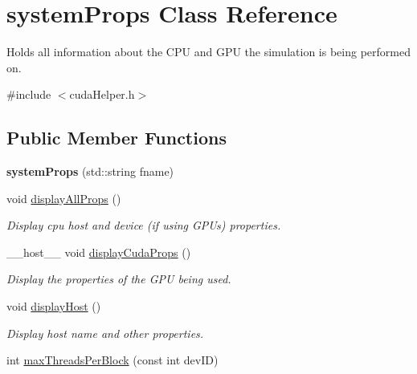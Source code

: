 \hypertarget{classsystem_props}{\section{system\-Props Class Reference}
\label{classsystem_props}
}


Holds all information about the C\-P\-U and G\-P\-U the simulation is being performed on.  




{\ttfamily \#include $<$cuda\-Helper.\-h$>$}

\subsection*{Public Member Functions}
\begin{DoxyCompactItemize}
\item 
\hypertarget{classsystem_props_a95e6d858d3ee3a0c9670156cf07c9e74}{{\bfseries system\-Props} (std\-::string fname)}\label{classsystem_props_a95e6d858d3ee3a0c9670156cf07c9e74}

\item 
\hypertarget{classsystem_props_a5268e0f1a250cdf0810e9d899b85bea2}{void \hyperlink{classsystem_props_a5268e0f1a250cdf0810e9d899b85bea2}{display\-All\-Props} ()}\label{classsystem_props_a5268e0f1a250cdf0810e9d899b85bea2}

\begin{DoxyCompactList}\small\item\em Display cpu host and device (if using G\-P\-Us) properties. \end{DoxyCompactList}\item 
\hypertarget{classsystem_props_aec22f83e71043fd60cb61a45fcc25b02}{\-\_\-\-\_\-host\-\_\-\-\_\- void \hyperlink{classsystem_props_aec22f83e71043fd60cb61a45fcc25b02}{display\-Cuda\-Props} ()}\label{classsystem_props_aec22f83e71043fd60cb61a45fcc25b02}

\begin{DoxyCompactList}\small\item\em Display the properties of the G\-P\-U being used. \end{DoxyCompactList}\item 
\hypertarget{classsystem_props_aeec628e3f468a2b274f08a0777dea6f1}{void \hyperlink{classsystem_props_aeec628e3f468a2b274f08a0777dea6f1}{display\-Host} ()}\label{classsystem_props_aeec628e3f468a2b274f08a0777dea6f1}

\begin{DoxyCompactList}\small\item\em Display host name and other properties. \end{DoxyCompactList}\item 
\hypertarget{classsystem_props_acfde8d62af2c239f6a52c02985099185}{int \hyperlink{classsystem_props_acfde8d62af2c239f6a52c02985099185}{max\-Threads\-Per\-Block} (const int dev\-I\-D)}\label{classsystem_props_acfde8d62af2c239f6a52c02985099185}


\end{DoxyCompactItemize}

